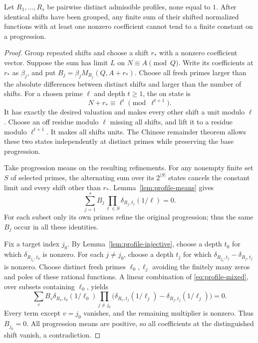 \begin{lemma}
\label{lem:profile-separation}
Let $R_1,\ldots,R_s$ be pairwise distinct admissible profiles,
none equal to $1$.  After identical shifts have been grouped, any
finite sum of their shifted normalized functions with at least one
nonzero coefficient cannot tend to a finite constant on a progression.
\end{lemma}
\begin{proof}
Group repeated shifts and choose a shift $r_*$ with a nonzero
coefficient vector.  Suppose
the sum has limit $L$ on $N\equiv A\pmod Q$.  Write its coefficients
at $r_*$ as $\beta_j$, and put
$B_j=\beta_jM_{R_j}(Q,A+r_*)$.
Choose all fresh primes larger than the absolute differences between
distinct shifts and larger than the number of shifts.  For a chosen
prime $\ell$ and depth $t\geq1$, the on state is
\[
 N+r_*\equiv\ell^t\pmod{\ell^{t+1}}.
\]
It has exactly the desired valuation and makes every other shift a
unit modulo $\ell$.  Choose an off residue modulo $\ell$ missing
all shifts, and lift it to a residue modulo $\ell^{t+1}$.  It makes
all shifts units.  The Chinese remainder theorem allows these two
states independently at distinct primes while preserving the base
progression.

Take progression means on the resulting refinements.  For any
nonempty finite set $S$ of selected primes, the alternating sum over
its $2^{|S|}$ states cancels the constant limit and every shift other
than $r_*$.  Lemma~\ref{lem:profile-means} gives
\begin{equation}\label{eq:profile-mixed}
 \sum_{j=1}^s B_j\prod_{\ell\in S}
          \delta_{R_j,t_\ell}(1/\ell)=0.
\end{equation}
For each subset only its own primes refine the original progression;
thus the same $B_j$ occur in all these identities.

Fix a target index $j_0$.  By Lemma~\ref{lem:profile-injective},
choose a depth $t_0$ for which $\delta_{R_{j_0},t_0}$ is nonzero.
For each $j\ne j_0$, choose a depth $t_j$ for which
$\delta_{R_{j_0},t_j}-\delta_{R_j,t_j}$ is nonzero.  Choose distinct
fresh primes $\ell_0,\ell_j$ avoiding the finitely many zeros and
poles of these rational functions.  A linear combination of
\eqref{eq:profile-mixed}, over subsets containing $\ell_0$, yields
\[
 \sum_v B_v\delta_{R_v,t_0}(1/\ell_0)
  \prod_{j\ne j_0}
   \bigl(\delta_{R_v,t_j}(1/\ell_j)
              -\delta_{R_j,t_j}(1/\ell_j)\bigr)=0.
\]
Every term except $v=j_0$ vanishes, and the remaining multiplier is
nonzero.  Thus $B_{j_0}=0$.  All progression means are positive, so
all coefficients at the distinguished shift vanish, a contradiction.
\end{proof}

